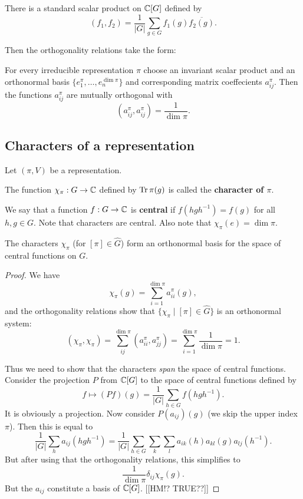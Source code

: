 \documentclass[11pt, english]{article}
\begin{document}
There is a standard scalar product on $\mathbb{C}[G]$ defined by
$$
(f_1,f_2) = \frac 1{\lvert G \rvert} \sum_{g \in G} f_1(g) \overline{f_2(g)}.
$$

Then the orthogonality relations take the form:

\begin{thm}
 For every irreducible representation $\pi$ choose an invariant scalar product and an orthonormal basis $\{e_1^\pi, \ldots, e_n^{\dim \pi}\}$ and corresponding matrix coeffecients $a_{ij}^\pi$. Then the functions $a_{ij}^\pi$ are mutually orthogonal with
$$
\left (a_{ij}^\pi, a_{ij}^\pi\right) = \frac{1}{\dim \pi}.
$$
\end{thm}

\subsection{Characters of a representation}

Let $(\pi,V)$ be a representation. 

The function $\chi_\pi:G \to \mathbb{C}$ defined by $\operatorname{Tr} \pi(g)$ is called the \textbf{character of $\pi$}.

We say that a function $f:G \to \mathbb{C}$ is \textbf{central} if $f(hgh^{-1})=f(g)$ for all $h,g \in G$. Note that characters are central. Also note that $\chi_\pi(e)=\dim \pi$. 

\begin{thm}
 The characters $\chi_\pi$ (for $[\pi] \in \widehat G$) form an orthonormal basis for the space of central functions on $G$.
\end{thm}
\begin{proof}
 We have
$$
\chi_\pi(g) = \sum_{i=1}^{\dim \pi} a_{ii}^\pi(g),
$$
and the orthogonality relations show that $\{ \chi_\pi \mid [\pi] \in \widehat G \}$ is an orthonormal system:
$$
(\chi_\pi, \chi_\pi) = \sum_{ij}^{\dim \pi} (a_{ii}^\pi, a_{jj}^\pi) = 
\sum_{i=1}^{\dim \pi} \frac{1}{\dim \pi} = 1.
$$

Thus we need to show that the characters \emph{span} the space of central functions. Consider the projection $P$ from $\mathbb{C}[G]$ to the space of central functions defined by
$$
f \mapsto (Pf)(g) = \frac{1}{\lvert G \rvert }\sum_{h \in G} f(hgh^{-1}).
$$
It is obviously a projection. Now consider $P(a_{ij})(g)$ (we skip the upper index $\pi$). Then this is equal to
$$
\frac{1}{\lvert G \rvert} \sum_h a_{ij}(hgh^{-1}) = \frac{1}{\lvert G \rvert} \sum_{h \in G} \sum_k \sum_l a_{ik}(h) a_{kl}(g) a_{lj}(h^{-1}).
$$
But after using that the orthogonality relations, this simplifies to
$$
\frac{1}{\dim \pi} \delta_{ij} \chi_\pi(g).
$$
But the $a_{ij}$ constitute a basis of $\mathbb{C}[G]$. [[HM!? TRUE??]]
\end{proof}
\end{document}
